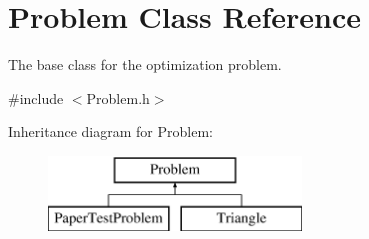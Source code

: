 \hypertarget{classProblem}{}\section{Problem Class Reference}
\label{classProblem}


The base class for the optimization problem.  




{\ttfamily \#include $<$Problem.\+h$>$}

Inheritance diagram for Problem\+:\begin{figure}[H]
\begin{center}
\leavevmode
\includegraphics[height=2.000000cm]{classProblem}
\end{center}
\end{figure}
